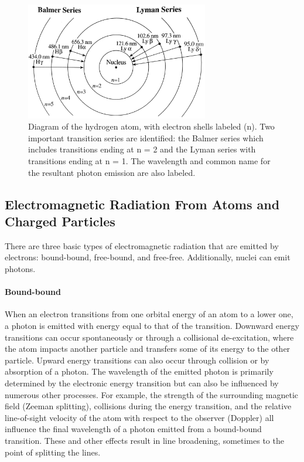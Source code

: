 \begin{figure}[!h]
    \begin{center}
	    \includegraphics[width=80mm]{Images/HydrogenTransitions.png}
    \end{center}
    \caption[Atomic Transitions for Balmer and Lyman Series]{
        Diagram of the hydrogen atom, with electron shells labeled (n). Two important transition series are 
        identified: the Balmer series which includes transitions ending at n = 2 and the Lyman series with 
        transitions ending at n = 1. The wavelength and common name for the resultant photon emission are also labeled. 
    }
    \label{fig:balmerandlyman}
\end{figure}

\subsection{Electromagnetic Radiation From Atoms and Charged Particles}
There are three basic types of electromagnetic radiation that are emitted by electrons: bound-bound, free-bound, and free-free. Additionally, nuclei can emit photons. 

\paragraph{Bound-bound}
When an electron transitions from one orbital energy of an atom to a lower one, a photon is emitted with energy equal to that of the transition. Downward energy transitions can occur spontaneously or through a collisional de-excitation, where the atom impacts another particle and transfers some of its energy to the other particle. Upward energy transitions can also occur through collision or by absorption of a photon. The wavelength of the emitted photon is primarily determined by the electronic energy transition but can also be influenced by numerous other processes. For example, the strength of the surrounding magnetic field (Zeeman splitting), collisions during the energy transition, and the relative line-of-sight velocity of the atom with respect to the observer (Doppler) all influence the final wavelength of a photon emitted from a bound-bound transition. These and other effects result in line broadening, sometimes to the point of splitting the lines. 

